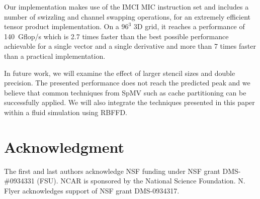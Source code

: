 \documentclass[10pt,conference,compsocconf]{IEEEtran}
\begin{document}
Our implementation makes use of the IMCI MIC instruction set and
includes a number of swizzling and channel swapping operations, for an
extremely efficient tensor product implementation. On a $96^3$ 3D
grid, it reaches a performance of 140~Gflop/s which is 2.7 times
faster than the best possible performance achievable for a single
vector and a single derivative and more than 7 times faster than a
practical implementation.

In future work, we will examine the effect of larger stencil sizes and
double precision. The presented performance does not reach the predicted
peak and we believe that common techniques from SpMV such as cache
partitioning can be successfully applied. We will also integrate the
techniques presented in this paper within a fluid simulation using
RBFFD.

\section*{Acknowledgment}
The first and last authors acknowledge NSF funding under NSF grant
DMS-\#0934331 (FSU). NCAR is sponsored by the National Science
Foundation. N. Flyer acknowledges support of NSF grant DMS-0934317.



\end{document}
